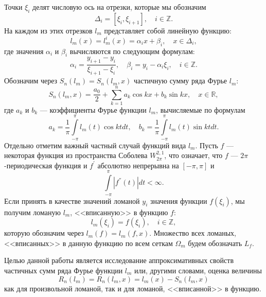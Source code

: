 Точки $\xi_i$ делят числовую ось на отрезки, которые мы обозначим
\begin{equation}
\Delta_i = [\xi_i, \xi_{i+1}], \quad i \in \mathbb{Z}.
\end{equation}
На каждом из этих отрезков $l_m$ представляет собой линейную функцию:
\begin{equation}
l_m(x) = l_m^i(x) = \alpha_ix+\beta_i, \quad x \in \Delta_i, \label{l_i equation}
\end{equation}
где значения $\alpha_i$ и $\beta_i$ вычисляются по следующим формулам:
\begin{equation}
\alpha_i = \frac{y_{i+1}-y_i}{\xi_{i+1}-\xi_i}, \quad \beta_i = y_i - \alpha_i \xi_i, \quad i \in \mathbb{Z}.
\end{equation}
Обозначим через $S_n(l_m) = S_n(l_m,x)$ частичную сумму ряда Фурье $l_m$:
\begin{equation}
S_n(l_m,x) = \frac{a_0}{2} + \sum\limits_{k=1}^{n} a_k \cos kx + b_k \sin kx, \quad x \in \mathbb{R},\label{S_n}
\end{equation}
где $a_k$ и $b_k$ --- коэффициенты Фурье функции $l_m$, вычисляемые по формулам
\begin{equation}
a_k = \frac1\pi \int\limits_{-\pi}^{\pi} l_m(t) \cos kt dt, \label{a_k b_k for f}
\quad
b_k = \frac1\pi \int\limits_{-\pi}^{\pi} l_m(t) \sin kt dt.
\end{equation}
Отдельно отметим важный частный случай функций вида $l_m$. Пусть $f$ --- некоторая функция из пространства Соболева $W_{2\pi}^{2,1}$, что означает, что $f$ --- $2\pi$-периодическая функция и $f^{'}$ абсолютно непрерывна на $[-\pi,\pi]$ и
\begin{equation}
\int\limits_{-\pi}^{\pi} | f^{''}(t) |dt < \infty.
\end{equation}
Если принять в качестве значений ломаной \(y_i\) значения функции $f(\xi_i)$, мы получим ломаную $l_m$, <<вписанную>> в функцию $f$:
\begin{equation}
l_m(\xi_i) = f(\xi_i), \quad i \in \mathbb{Z},
\end{equation}
которую обозначим через $l_m(f) = l_m(f,x)$. Множество всех ломаных, <<вписанных>> в данную функцию по всем сеткам $\Omega_m$ будем обозначать $L_f$.

Целью данной работы является исследование аппроксимативных свойств частичных
сумм ряда Фурье функции $l_m$ или, другими словами, оценка величины
\begin{equation}
R_n(l_m) = R_n(l_m,x) = l_m(x) - S_n(l_m,x)  \label{R_n}
\end{equation}
как для произвольной ломаной, так и для ломаной, <<вписанной>> в функцию.

